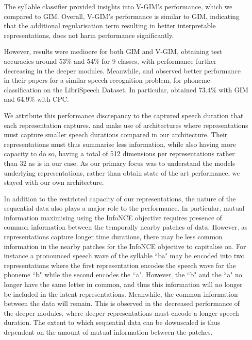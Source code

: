		The syllable classifier provided insights into V-GIM's performance, which we compared to GIM. Overall, V-GIM's performance is similar to GIM, indicating that the additional regularisation term resulting in better interpretable representations, does not harm performance significantly.
		
		However, results were mediocre for both GIM and V-GIM, obtaining test accuracies around 53\% and 54\% for 9 classes, with performance further decreasing in the deeper modules. Meanwhile, \cite{oordRepresentationLearningContrastive2019} and \cite{lowePuttingEndEndtoEnd2020} observed better performance in their papers for a similar speech recognition problem, for phoneme classification on the LibriSpeech Dataset. In particular, \citeauthor{lowePuttingEndEndtoEnd2020} obtained 73.4\% with GIM and 64.9\% with CPC.
		
		We attribute this performance discrepancy to the captured speech duration that each representation captures. \citeauthor{lowePuttingEndEndtoEnd2020} and \citeauthor{oordRepresentationLearningContrastive2019} make use of architectures where representations must capture smaller speech durations compared in our architecture. Their representations must thus summarise less information, while also having more capacity to do so, having a total of 512 dimensions per representations rather than 32 as is in our case. As our primary focus was to understand the models underlying representations, rather than obtain state of the art performance, we stayed with our own architecture.
		
		In addition to the restricted capacity of our representations, the nature of the sequential data also plays a major role to the performance. In particular, mutual information maximising using the InfoNCE objective requires presence of common information between the temporally nearby patches of data. However, as representations capture longer time durations, there may be less common information in the nearby patches for the InfoNCE objective to capitalise on. For instance a pronounced speech wave of the syllable ``ba" may be encoded into two representations where the first representation encodes the speech wave for the phoneme ``b" while the second encodes the ``a". However, the ``b" and the ``a" no longer have the same letter in common, and thus this information will no longer be included in the latent representations. Meanwhile, the common information between the data will remain. This is observed in the decreased performance of the deeper modules, where deeper representations must encode a longer speech duration. The extent to which sequential data can be downscaled is thus dependent on the amount of mutual information between the patches.
		
